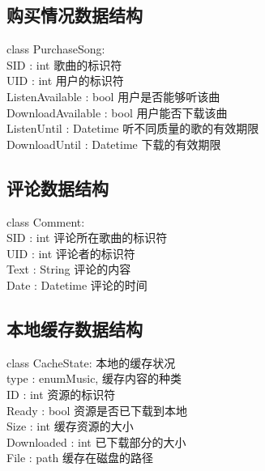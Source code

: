 \subsection{购买情况数据结构}

class PurchaseSong:\\
\indent \indent    SID : int           歌曲的标识符\\
\indent \indent    UID : int           用户的标识符\\
\indent \indent    ListenAvailable : bool    用户是否能够听该曲\\
\indent \indent    DownloadAvailable : bool  用户能否下载该曲\\
\indent \indent    ListenUntil : Datetime    听不同质量的歌的有效期限\\
\indent \indent    DownloadUntil : Datetime  下载的有效期限

\subsection{评论数据结构}

class Comment:\\
\indent \indent    SID : int           评论所在歌曲的标识符\\
\indent \indent    UID : int           评论者的标识符\\
\indent \indent    Text : String       评论的内容\\
\indent \indent    Date : Datetime     评论的时间

\subsection{本地缓存数据结构}

class CacheState:       本地的缓存状况\\
\indent \indent    type : enum{Music, }
\indent \indent                        缓存内容的种类\\
\indent \indent    ID : int            资源的标识符\\
\indent \indent    Ready : bool        资源是否已下载到本地\\
\indent \indent    Size : int          缓存资源的大小\\
\indent \indent    Downloaded : int    已下载部分的大小\\
\indent \indent    File : path         缓存在磁盘的路径\\


